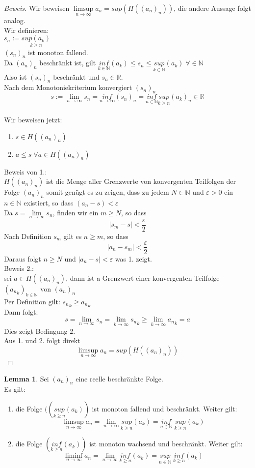 \documentclass[12pt,a4paper,titlepage]{article} %
\theoremstyle{definition}
\newtheorem{lem}[satz]{Lemma}
\theoremstyle{remark}
\newenvironment{bew}{\begin{proof}[Beweis]}{\end{proof}}
\newcommand{\N}{\mathbb{N}}
\newcommand{\R}{\mathbb{R}}
\newcommand{\limes}[1]{\lim\limits_{#1\rightarrow\infty}}
\newcommand{\limessup}[1]{\limsup \limits_{#1\rightarrow\infty}}
\newcommand{\limesinf}[1]{\liminf \limits_{#1\rightarrow\infty}}
\begin{document}
	\begin{bew}
		Wir beweisen \(\limessup{n} a_n = sup(H((a_n)_n))\), die andere Aussage folgt analog.\\
		Wir definieren:\\
		\(s_n := \underset{k \geq n}{sup(a_k)}\)\\
		\((s_n)_n\) ist monoton fallend.\\
		Da \((a_n)_n\) beschränkt ist, gilt \(\underset{k \in \N}{inf}(a_k) \leq s_n \leq \underset{k \in \N}{sup}(a_k) \; \forall \in \N\)\\
		Also ist \((s_n)_n\) beschränkt und \(s_n \in \R\).\\
		Nach dem Monotoniekriterium konvergiert \((s_n)_n\)\\
		\[s := \limes{n} s_n = \underset{n \rightarrow \infty}{inf}(s_n)_n = \underset{n \in \N}{inf}\underset{k \geq n}{sup}(a_k)_n \in \R\]\\
		Wir beweisen jetzt:
		\begin{enumerate}
			\item \(s \in H((a_n)_n)\)
			\item \(a \leq s \; \forall a \in H((a_n)_n)\)
		\end{enumerate}
		Beweis von 1.:\\
		\(H((a_n)_n)\) ist die Menge aller Grenzwerte von konvergenten Teilfolgen der Folge \((a_n)_n\) somit genügt es zu zeigen, dass zu jedem \(N \in \N\) und \(\varepsilon > 0\) ein \(n \in \N\) existiert, so dass \((a_n - s) < \varepsilon\)\\
		Da \(s = \limes{n} s_n\), finden wir ein \(m \geq N\), so dass 
		\[|s_m - s| < \frac{\varepsilon}{2}\]
		Nach Definition \(s_m\) gilt es \(n \geq m\), so dass
		\[|a_n - s_m| < \frac{\varepsilon}{2}\]
		Daraus folgt \(n \geq N\) und \(|a_n - s| < \varepsilon\) was 1. zeigt.\\
		Beweis 2.:\\
		sei \(a \in H((a_n)_n)\), dann ist a Grenzwert einer konvergenten Teilfolge \(({a_n}_k)_{k \in \N}\) von \((a_n)_n\)\\
		Per Definition gilt: \({s_n}_k \geq {a_n}_k\)\\
		Dann folgt:
		\[s = \limes{n} s_n = \limes{k} {s_n}_k \geq \limes{k} {a_n}_k = a\]
		Dies zeigt Bedingung 2.\\
		Aus 1. und 2. folgt direkt
		\[\limessup{n} a_n = sup(H((a_n)_n))\]
	\end{bew}
	\begin{lem}
		Sei \((a_n)_n\) eine reelle beschränkte Folge.\\
		Es gilt: 
		\begin{enumerate}
			\item 
				die Folge \(((\underset{k \geq n}{sup}(a_k))\) ist monoton fallend und beschränkt. Weiter gilt:
				\[\limessup{n} a_n = \limes{n} \underset{k \geq n}{sup} (a_k) = \underset{n \in \N}{inf} \; \underset{k \geq n}{sup} (a_k)\]
			\item 
				die Folge \((\underset{k \geq n}{inf} (a_k))\) ist monoton wachsend und beschränkt. Weiter gilt:
				\[\limesinf{n} a_n = \limes{n} \underset{k \geq n}{inf} (a_k) = \underset{n \in \N}{sup} \; \underset{k \geq n}{inf} (a_k)\]
		\end{enumerate}		
	\end{lem}
\end{document}
